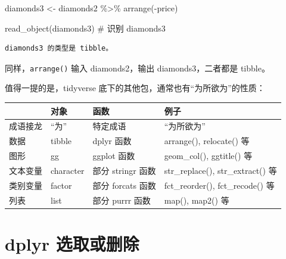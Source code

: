 \documentclass[
  letterpaper,
]{ctexbook}
\newenvironment{Shaded}{\begin{snugshade}}{\end{snugshade}}
\newcommand{\CommentTok}[1]{\textcolor[rgb]{0.37,0.37,0.37}{#1}}
\newcommand{\FunctionTok}[1]{\textcolor[rgb]{0.28,0.35,0.67}{#1}}
\newcommand{\NormalTok}[1]{\textcolor[rgb]{0.00,0.23,0.31}{#1}}
\newcommand{\OtherTok}[1]{\textcolor[rgb]{0.00,0.23,0.31}{#1}}
\newcommand{\SpecialCharTok}[1]{\textcolor[rgb]{0.37,0.37,0.37}{#1}}
\begin{document}
\begin{Shaded}
\begin{Highlighting}[]
\NormalTok{diamonds3 }\OtherTok{\textless{}{-}}\NormalTok{ diamonds2 }\SpecialCharTok{\%\textgreater{}\%}
  \FunctionTok{arrange}\NormalTok{(}\SpecialCharTok{{-}}\NormalTok{price)}

\FunctionTok{read\_object}\NormalTok{(diamonds3) }\CommentTok{\# 识别 diamonds3}
\end{Highlighting}
\end{Shaded}

\begin{verbatim}
diamonds3 的类型是 tibble。
\end{verbatim}

\begin{tcolorbox}[enhanced jigsaw, bottomtitle=1mm, bottomrule=.15mm, coltitle=black, title=\textcolor{quarto-callout-tip-color}{\faLightbulb}\hspace{0.5em}{提示}, toptitle=1mm, colframe=quarto-callout-tip-color-frame, colbacktitle=quarto-callout-tip-color!10!white, opacitybacktitle=0.6, arc=.35mm, opacityback=0, breakable, toprule=.15mm, left=2mm, titlerule=0mm, rightrule=.15mm, colback=white, leftrule=.75mm]

同样，\texttt{arrange()} 输入 diamonds2，输出 diamonds3，二者都是
tibble。

\end{tcolorbox}

值得一提的是，tidyverse 底下的其他包，通常也有``为所欲为''的性质：

\begin{longtable}[]{@{}llll@{}}
\toprule\noalign{}
& 对象 & 函数 & 例子 \\
\midrule\noalign{}
\endhead
\bottomrule\noalign{}
\endlastfoot
成语接龙 & ``为'' & 特定成语 & ``为所欲为'' \\
数据 & tibble & dplyr 函数 & arrange(), relocate() 等 \\
图形 & gg & ggplot 函数 & geom\_col(), ggtitle() 等 \\
文本变量 & character & 部分 stringr 函数 & str\_replace(),
str\_extract() 等 \\
类别变量 & factor & 部分 forcats 函数 & fct\_reorder(), fct\_recode()
等 \\
列表 & list & 部分 purrr 函数 & map(), map2() 等 \\
\end{longtable}

\hypertarget{dplyr-ux9009ux53d6ux6216ux5220ux9664}{%
\chapter{dplyr 选取或删除}\label{dplyr-ux9009ux53d6ux6216ux5220ux9664}}
\end{document}
